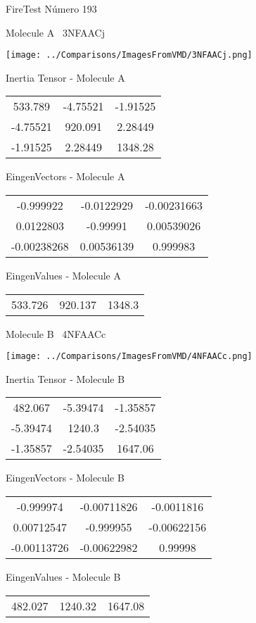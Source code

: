 \vtab[-3cm]
\begin{center}
{\large FireTest \tab Número 193}
\end{center}
\begin{multicols}{2}
\begin{center}

Molecule A \
3NFAACj

\texttt{[image: ../Comparisons/ImagesFromVMD/3NFAACj.png]}

Inertia Tensor - Molecule A \\
\begin{tabular}{|c c c|}
533.789	 & 	-4.75521	 & 	-1.91525	 \\
-4.75521	 & 	920.091	 & 	2.28449	 \\
-1.91525	 & 	2.28449	 & 	1348.28
\end{tabular}

\vtab
 EingenVectors - Molecule A     \\
\begin{tabular}{|c c c|}
-0.999922	 & 	-0.0122929	 & 	-0.00231663	 \\
0.0122803	 & 	-0.99991	 & 	0.00539026	 \\
-0.00238268	 & 	0.00536139	 & 	0.999983
\end{tabular}

\vtab
 EingenValues - Molecule A     \\
\begin{tabular}{|c c c|}
533.726	 & 	920.137	 & 	1348.3	 \\
\end{tabular}
\columnbreak

Molecule B \
4NFAACc

\texttt{[image: ../Comparisons/ImagesFromVMD/4NFAACc.png]}

Inertia Tensor - Molecule B \\
\begin{tabular}{|c c c|}
482.067	 & 	-5.39474	 & 	-1.35857	 \\
-5.39474	 & 	1240.3	 & 	-2.54035	 \\
-1.35857	 & 	-2.54035	 & 	1647.06
\end{tabular}

\vtab
 EingenVectors - Molecule B     \\
\begin{tabular}{|c c c|}
-0.999974	 & 	-0.00711826	 & 	-0.0011816	 \\
0.00712547	 & 	-0.999955	 & 	-0.00622156	 \\
-0.00113726	 & 	-0.00622982	 & 	0.99998
\end{tabular}

\vtab
 EingenValues - Molecule B     \\
\begin{tabular}{|c c c|}
482.027	 & 	1240.32	 & 	1647.08	 \\
\end{tabular}

\end{center}
\end{multicols}

